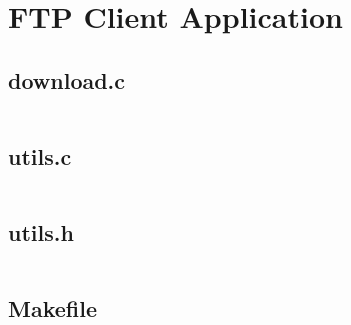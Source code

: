 \documentclass[11pt]{report}
\begin{document}
\clearpage

\section{FTP Client Application}

\subsection{download.c}

\inputminted[breaklines]{c}{../src/download.c}

\newpage

\subsection{utils.c}

\inputminted[breaklines]{c}{../src/utils.c}

\newpage

\subsection{utils.h}

\inputminted[breaklines]{c}{../src/utils.h}

\newpage

\subsection{Makefile}

\inputminted[breaklines]{make}{../src/Makefile}
\end{document}
